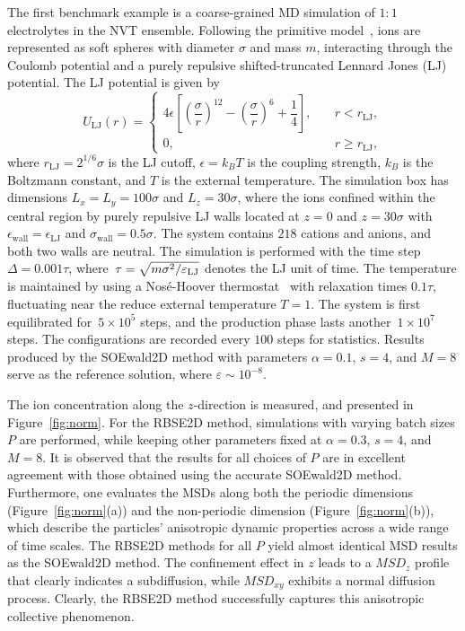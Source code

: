 The first benchmark example is a coarse-grained MD simulation of  $1:1$ electrolytes in the NVT ensemble. 
Following the primitive model~\cite{frenkel2023understanding}, ions are represented as soft spheres with diameter $\sigma$ and mass $m$, interacting through the Coulomb potential and a purely repulsive shifted-truncated Lennard Jones (LJ) potential. 
The LJ potential is given by
\begin{equation}
	U_{\text{LJ}}(r) = 
	\begin{cases}
		4 \epsilon \left[ \left(\dfrac{\sigma}{r}\right)^{12}-\left(\dfrac{\sigma}{r}\right)^6 + \dfrac{1}{4}\right],\quad & r < r_{\text{LJ}}, \\
		0, & r \geq r_{\text{LJ}},
	\end{cases}
\end{equation}
where $r_{\text{LJ}} = 2^{1/6} \sigma$ is the LJ cutoff, $\epsilon = k_B T$ is the coupling strength, $k_B$ is the Boltzmann constant, and $T$ is the external temperature. 
The simulation box has dimensions $L_x = L_y = 100 \sigma$ and $L_z = 30 \sigma$, where the ions confined within the central region by purely repulsive LJ walls located at $z = 0$ and $z = 30 \sigma$ with $\epsilon_{\text{wall}} = \epsilon_{\text{LJ}}$ and $\sigma_{\text{wall}} = 0.5 \sigma$. 
The system contains $218$ cations and anions, and both two walls are neutral. 
The simulation is performed with the time step~$\Delta=0.001\tau$, where~$\tau = \sqrt{m \sigma^2 / \varepsilon_{\text{LJ}}}$ denotes the LJ unit of time. 
The temperature is maintained by using a Nos\'e-Hoover thermostat~\cite{frenkel2023understanding} with relaxation times $0.1\tau$, fluctuating near the reduce external temperature $T=1$.
The system is first equilibrated for~$5 \times 10^5$ steps, and the production phase lasts another~$1 \times 10^7$ steps. 
The configurations are recorded every $100$ steps for statistics. Results produced by the SOEwald2D method with parameters $\alpha=0.1$, $s=4$, and $M=8$ serve as the reference solution, where $\varepsilon\sim 10^{-8}$.

The ion concentration along the $z$-direction is measured, and presented in Figure~\ref{fig:norm}. 
For the RBSE2D method, simulations with varying batch sizes $P$ are performed, while keeping other parameters fixed at $\alpha = 0.3$, $s=4$, and $M=8$. 
It is observed that the results for all choices of $P$ are in excellent agreement with those obtained using the accurate SOEwald2D method. 
Furthermore, one evaluates the MSDs along both the periodic dimensions (Figure~\ref{fig:norm}(a)) and the non-periodic dimension (Figure~\ref{fig:norm}(b)), which describe the particles' anisotropic dynamic properties across a wide range of time scales. 
The RBSE2D methods for all $P$ yield almost identical MSD results as the SOEwald2D method. 
The confinement effect in $z$ leads to a $MSD_z$ profile that clearly indicates a subdiffusion, while $MSD_{xy}$ exhibits a normal diffusion process. 
Clearly, the RBSE2D method successfully captures this anisotropic collective phenomenon.


